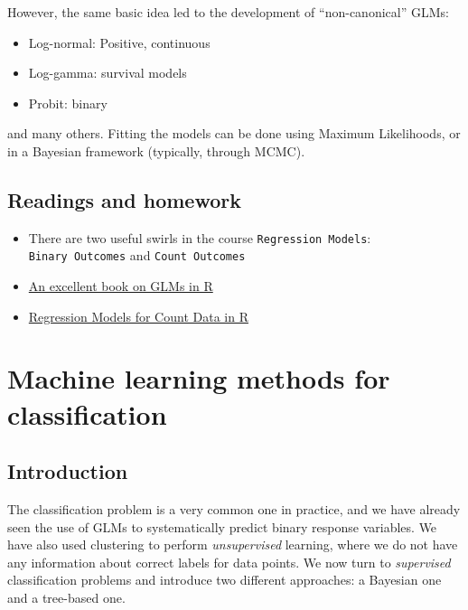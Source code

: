 \documentclass[
  letterpaper,
  DIV=11,
  numbers=noendperiod]{scrreprt}
\providecommand{\tightlist}{%
  \setlength{\itemsep}{0pt}\setlength{\parskip}{0pt}}\usepackage{longtable,booktabs,array}
\begin{document}
However, the same basic idea led to the development of ``non-canonical''
GLMs:

\begin{itemize}
\tightlist
\item
  Log-normal: Positive, continuous
\item
  Log-gamma: survival models
\item
  Probit: binary
\end{itemize}

and many others. Fitting the models can be done using Maximum
Likelihoods, or in a Bayesian framework (typically, through MCMC).

\hypertarget{readings-and-homework}{%
\section{Readings and homework}\label{readings-and-homework}}

\begin{itemize}
\tightlist
\item
  There are two useful swirls in the course \texttt{Regression\ Models}:
  \texttt{Binary\ Outcomes} and \texttt{Count\ Outcomes}
\item
  \href{https://link.springer.com/book/10.1007/978-1-4419-0118-7}{An
  excellent book on GLMs in R}
\item
  \href{https://cran.r-project.org/web/packages/pscl/vignettes/countreg.pdf}{Regression
  Models for Count Data in R}
\end{itemize}


\hypertarget{machine-learning-methods-for-classification}{%
\chapter{Machine learning methods for
classification}\label{machine-learning-methods-for-classification}}

\hypertarget{introduction-1}{%
\section{Introduction}\label{introduction-1}}

The classification problem is a very common one in practice, and we have
already seen the use of GLMs to systematically predict binary response
variables. We have also used clustering to perform \emph{unsupervised}
learning, where we do not have any information about correct labels for
data points. We now turn to \emph{supervised} classification problems
and introduce two different approaches: a Bayesian one and a tree-based
one.
\end{document}

